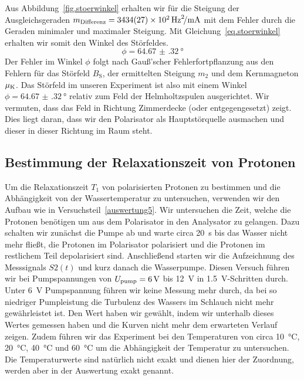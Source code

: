 \documentclass[paper=a4,
	fontsize=10pt,
	DIV=18,
	twocolumn,
	parskip=half
	]{scrartcl}
\numberwithin{equation}{section}    %
\begin{document}
Aus Abbildung~\ref{fig.stoerwinkel} erhalten wir für die Steigung der Ausgleichsgeraden $m_{\rm Differenz} = \SI[per-mode=symbol]{3434(27)e2}{\hertz\squared\per\milli\ampere}$ mit dem Fehler durch die Geraden minimaler und maximaler Steigung.
Mit Gleichung~\eqref{eq.stoerwinkel} erhalten wir somit den Winkel des Störfeldes.
\begin{equation}
	\phi = \SI{64.67(32)}{\degree}
\end{equation}
Der Fehler im Winkel $\phi$ folgt nach Gauß'scher Fehlerfortpflanzung aus den Fehlern für das Störfeld $B_\mathrm{S}$, der ermittelten Steigung $m_2$ und dem Kernmagneton $\mu_{\rm K}$. Das Störfeld im unseren Experiment ist also mit einem Winkel $\phi = \SI{64.67(32)}{\degree}$ relativ zum Feld der Helmholtzspulen ausgerichtet. Wir vermuten, dass das Feld in Richtung Zimmerdecke (oder entgegengesetzt) zeigt. Dies liegt daran, dass wir den Polarisator als Hauptstörquelle ausmachen und dieser in dieser Richtung im Raum steht.

\subsection{Bestimmung der Relaxationszeit von Protonen}
\label{auswertung7}

Um die Relaxationszeit $T_1$ von polarisierten Protonen zu bestimmen und die Abhängigkeit von der Wassertemperatur zu untersuchen, verwenden wir den Aufbau wie in Versuchsteil~\ref{auswertung5}. Wir untersuchen die Zeit, welche die Protonen benötigen um aus dem Polarisator in den Analysator zu gelangen. Dazu schalten wir zunächst die Pumpe ab und warte circa \SI{20}{\second} bis das Wasser nicht mehr fließt, die Protonen im Polarisator polarisiert und die Protonen im restlichem Teil depolarisiert sind. Anschließend starten wir die Aufzeichnung des Messsignals $S2(t)$ und kurz danach die Wasserpumpe. Diesen Versuch führen wir bei Pumpspannungen von $U_{\rm pump}=\SI{6}{\volt}$ bis \SI{12}{\volt} in \SI{1.5}{\volt}-Schritten durch. Unter \SI{6}{\volt} Pumpspannung führen wir keine Messung mehr durch, da bei so niedriger Pumpleistung die Turbulenz des Wassers im Schlauch nicht mehr gewährleistet ist. Den Wert haben wir gewählt, indem wir unterhalb dieses Wertes gemessen haben und die Kurven nicht mehr dem erwarteten Verlauf zeigen. Zudem führen wir das Experiment bei den Temperaturen von circa \SI{10}{\celsius}, \SI{20}{\celsius}, \SI{40}{\celsius} und \SI{60}{\celsius} um die Abhängigkeit der Temperatur zu untersuchen. Die Temperaturwerte sind natürlich nicht exakt und dienen hier der Zuordnung, werden aber in der Auswertung exakt genannt.
\end{document}
